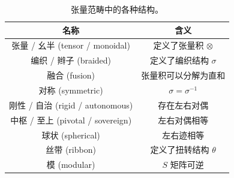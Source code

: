 \begin{table}[htb]
  \centering
  \begin{tabular}{cc}
    \toprule
      名称 & 含义 \\
    \midrule
      张量 / 幺半 (tensor / monoidal)   & 定义了张量积 $\otimes$  \\
      编织 / 辫子 (braided)             & 定义了编织结构 $\sigma$ \\
      融合        (fusion)              & 张量积可以分解为直和    \\
      对称        (symmetric)           & $\sigma=\sigma^{-1}$    \\
      刚性 / 自治 (rigid / autonomous)  & 存在左右对偶            \\
      中枢 / 至上 (pivotal / sovereign) & 左右对偶相等            \\
      球状        (spherical)           & 左右迹相等              \\
      丝带        (ribbon)              & 定义了扭转结构 $\theta$ \\
      模          (modular)             & $S$ 矩阵可逆            \\
    \bottomrule
  \end{tabular}
  \caption[张量范畴中的各种结构]{张量范畴中的各种结构。}
  \label{tab:tensor-category-ingredients}
\end{table}
